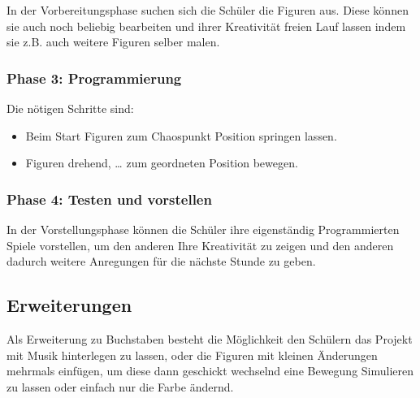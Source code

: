 In der Vorbereitungsphase suchen sich die Schüler die Figuren aus. Diese
können sie auch noch beliebig bearbeiten und ihrer Kreativität freien
Lauf lassen indem sie z.B. auch weitere Figuren selber malen.

\subsubsection{Phase 3: Programmierung}\label{phase-3-programmierung}

Die nötigen Schritte sind:

\begin{itemize}
\tightlist
\item
  Beim Start Figuren zum Chaospunkt Position springen lassen.
\item
  Figuren drehend, \ldots{} zum geordneten Position bewegen.
\end{itemize}

\subsubsection{Phase 4: Testen und
vorstellen}\label{phase-4-testen-und-vorstellen}

In der Vorstellungsphase können die Schüler ihre eigenständig
Programmierten Spiele vorstellen, um den anderen Ihre Kreativität zu
zeigen und den anderen dadurch weitere Anregungen für die nächste Stunde
zu geben.

\subsection{Erweiterungen}\label{erweiterungen}

Als Erweiterung zu Buchstaben besteht die Möglichkeit den Schülern das
Projekt mit Musik hinterlegen zu lassen, oder die Figuren mit kleinen
Änderungen mehrmals einfügen, um diese dann geschickt wechselnd eine
Bewegung Simulieren zu lassen oder einfach nur die Farbe ändernd.
